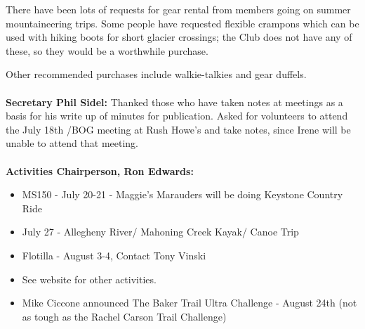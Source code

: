 \documentclass[10pt,a4paper]{article}
\begin{document}
\begin{multicols}{2}
There have been lots of requests for gear rental from members going on summer mountaineering trips. Some people have requested flexible crampons which can be used with hiking boots for short glacier crossings; the Club does not have any of these, so they would be a worthwhile purchase.

Other recommended purchases include walkie-talkies and gear duffels.\\
\\
\textbf{Secretary Phil Sidel:}    Thanked those who have taken notes at meetings as a basis for his write up of minutes for publication.  Asked for  volunteers to attend the July 18th /BOG  meeting at Rush Howe's and take notes, since Irene will be unable to attend that meeting.\\
\\
\textbf{Activities Chairperson, Ron Edwards:}
\begin{itemize}
\item   MS150 - July 20-21 - Maggie's Marauders will be doing Keystone Country Ride
\item   July 27 - Allegheny River/ Mahoning Creek Kayak/ Canoe Trip 
\item   Flotilla - August 3-4, Contact Tony Vinski
\item   See website for other activities.
\item   Mike Ciccone announced The Baker Trail Ultra Challenge - August 24th
     (not as tough as the Rachel Carson Trail Challenge)
\end{itemize}


\end{multicols}
\end{document}
